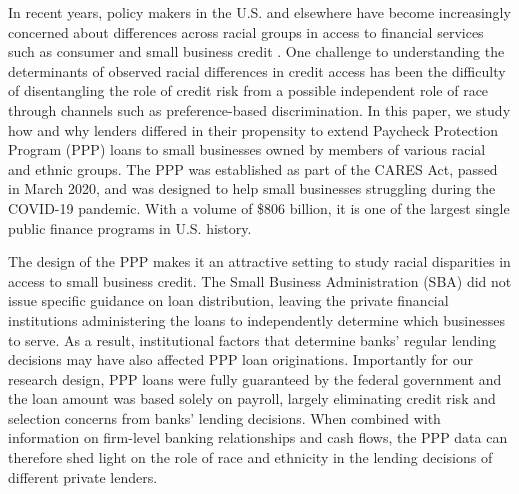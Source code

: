 \documentclass[11pt]{article}
\begin{document}
In recent years, policy makers in the U.S. and elsewhere have become increasingly concerned about differences across racial groups in access to financial services such as consumer and small business credit \citep{apblack,nytblack,ptblack}. One challenge to understanding the determinants of observed racial differences in credit access has been the difficulty of disentangling the role of credit risk from a possible independent role of race through channels such as preference-based discrimination. In this paper, we study how and why lenders differed in their propensity to extend Paycheck Protection Program (PPP) loans to small businesses owned by members of various racial and ethnic groups. The PPP was established as part of the CARES Act, passed in March 2020, and was designed to help small businesses struggling during the COVID-19 pandemic. With a volume of \$806 billion, it is one of the largest single public finance programs in U.S. history.

The design of the PPP makes it an attractive setting to study racial disparities in access to small business credit. The Small Business Administration (SBA) did not issue specific guidance on loan distribution, leaving the private financial institutions administering the loans to independently determine which businesses to serve. As a result, institutional factors that determine banks' regular lending decisions may have also affected PPP loan originations. Importantly for our research design, PPP loans were fully guaranteed by the federal government and the loan amount was based solely on payroll, largely eliminating credit risk and selection concerns from banks' lending decisions. When combined with information on firm-level banking relationships and cash flows, the PPP data can therefore shed light on the role of race and ethnicity in the lending decisions of different private lenders.
\end{document}
